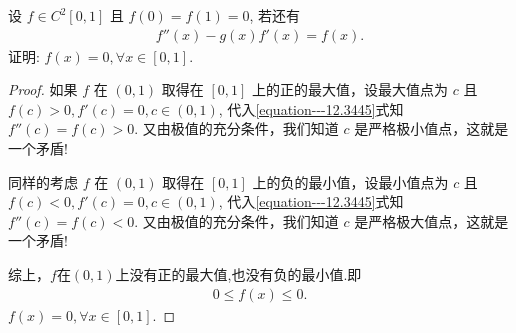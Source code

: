 \documentclass[../../main.tex]{subfiles}
\begin{document}
\begin{example}
设 $f\in C^2[0,1]$ 且 $f(0)=f(1)=0$, 若还有
\begin{align}
f''(x)-g(x)f'(x)=f(x).
\label{equation---12.3445}
\end{align}
证明:
$f(x)=0,\forall x\in[0,1]$.
\end{example}
\begin{proof}
如果 $f$ 在 $(0,1)$ 取得在 $[0,1]$ 上的正的最大值，设最大值点为 $c$ 且 $f(c)>0,f'(c)=0,c\in(0,1)$, 代入\eqref{equation---12.3445}式知 $f''(c)=f(c)>0$. 又由极值的充分条件，我们知道 $c$ 是严格极小值点，这就是一个矛盾!

同样的考虑 $f$ 在 $(0,1)$ 取得在 $[0,1]$ 上的负的最小值，设最小值点为 $c$ 且 $f(c)<0,f'(c)=0,c\in(0,1)$, 代入\eqref{equation---12.3445}式知 $f''(c)=f(c)<0$. 又由极值的充分条件，我们知道 $c$ 是严格极大值点，这就是一个矛盾!

综上，$f$在$(0,1)$上没有正的最大值,也没有负的最小值.即
\begin{align*}
0\leqslant f(x)\leqslant0.
\end{align*}
$f(x)=0,\forall x\in[0,1]$. 

\end{proof}
\end{document}
